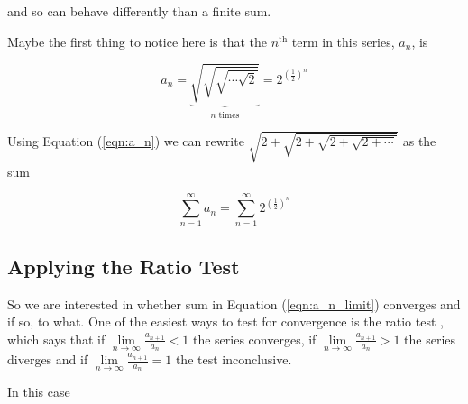 \documentclass{article}
\theoremstyle{definition}
\begin{document}
\bigskip
\noindent
and so can behave differently than a finite sum. 


\noindent
Maybe the first thing to notice here is that the $n^{\text{th}}$
term in this series, $a_n$, is

\bigskip
\begin{equation}
a_n = \underbrace{\sqrt{\sqrt{\sqrt{\cdots \sqrt{2}}}}}_\text{$n$ times} = 2^{{ \left (\tfrac{1}{2} \right )}^{n}}
\label{eqn:a_n}
\end{equation}

\bigskip
\noindent
Using Equation (\ref{eqn:a_n}) we can rewrite $\sqrt{2 + \sqrt{2
+ \sqrt{2 + \sqrt{2 + \cdots}}}}$ as the sum 

\bigskip
\begin{equation}
\sum\limits_{n=1}^{\infty} a_n = \sum\limits_{n=1}^{\infty} 2^{  {\left ( \tfrac{1}{2} \right )}^{n}}
\label{eqn:a_n_limit}
\end{equation}

\medskip
\subsection{Applying the Ratio Test}
\noindent
So we are interested in whether sum in Equation
(\ref{eqn:a_n_limit}) converges and if so, to what.  One of the
easiest ways to test for convergence is the ratio test
\cite{wiki:ratio_test}, which says that if
$\lim\limits_{n \to \infty} \tfrac{a_{n+1}}{a_n} < 1$ the series
converges, if $\lim\limits_{n \to \infty} \tfrac{a_{n+1}}{a_n} > 1$ 
the series diverges and if $\lim\limits_{n \to \infty}
\tfrac{a_{n+1}}{a_n} = 1$ the test inconclusive.


\bigskip
\noindent
In this case
\end{document}
